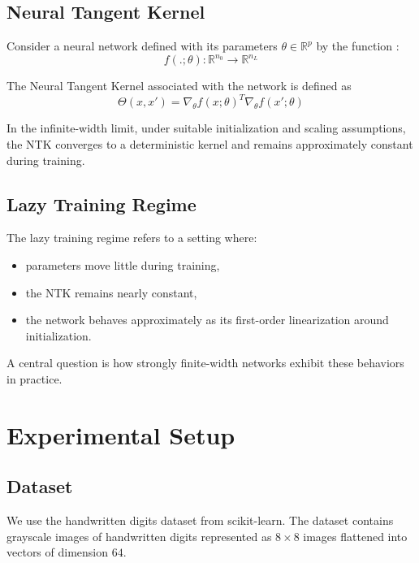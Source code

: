 \documentclass[11pt]{article}
\newcommand{\R}{\mathbb{R}}
\begin{document}
\subsection{Neural Tangent Kernel}

Consider a neural network defined with its parameters $\theta \in \R^p$ by the function : 
\[
f(.; \theta): \R^{n_0} \rightarrow \R^{n_L}
\]

The Neural Tangent Kernel associated with the network is defined as
\[
\Theta(x, x')
=
\nabla_\theta f(x; \theta)^T
\nabla_\theta f(x'; \theta)
\]

In the infinite-width limit, under suitable initialization and scaling assumptions, the NTK converges to a deterministic kernel and remains approximately constant during training.

\subsection{Lazy Training Regime}

The lazy training regime refers to a setting where:
\begin{itemize}
    \item parameters move little during training,
    \item the NTK remains nearly constant,
    \item the network behaves approximately as its first-order linearization around initialization.
\end{itemize}

A central question is how strongly finite-width networks exhibit these behaviors in practice.

\section{Experimental Setup}

\subsection{Dataset}

We use the handwritten digits dataset from scikit-learn.
The dataset contains grayscale images of handwritten digits represented as $8 \times 8$ images flattened into vectors of dimension $64$.
\end{document}
